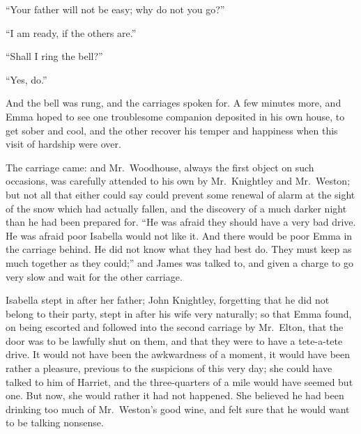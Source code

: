 ``Your father will not be easy; why do not you go?''

``I am ready, if the others are.''

``Shall I ring the bell?''

``Yes, do.''

And the bell was rung, and the carriages spoken for.  A few
minutes more, and Emma hoped to see one troublesome companion
deposited in his own house, to get sober and cool, and the other
recover his temper and happiness when this visit of hardship were over.

The carriage came:  and Mr.\ Woodhouse, always the first object on
such occasions, was carefully attended to his own by Mr.\ Knightley
and Mr.\ Weston; but not all that either could say could prevent some
renewal of alarm at the sight of the snow which had actually fallen,
and the discovery of a much darker night than he had been prepared for.
``He was afraid they should have a very bad drive.  He was afraid
poor Isabella would not like it.  And there would be poor Emma
in the carriage behind.  He did not know what they had best do.
They must keep as much together as they could;'' and James was talked to,
and given a charge to go very slow and wait for the other carriage.

Isabella stept in after her father; John Knightley, forgetting that he
did not belong to their party, stept in after his wife very naturally;
so that Emma found, on being escorted and followed into the second
carriage by Mr.\ Elton, that the door was to be lawfully shut on them,
and that they were to have a tete-a-tete drive.  It would not have been
the awkwardness of a moment, it would have been rather a pleasure,
previous to the suspicions of this very day; she could have talked
to him of Harriet, and the three-quarters of a mile would have
seemed but one.  But now, she would rather it had not happened.
She believed he had been drinking too much of Mr.\ Weston's good wine,
and felt sure that he would want to be talking nonsense.

